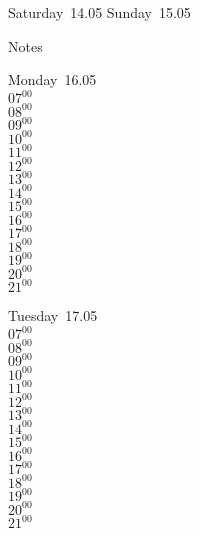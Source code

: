 \documentclass[11pt,a4paper]{book}\usepackage[]{graphicx}\usepackage[]{color}
\begin{document}
\begin{weekendbox}
  Saturday~14.05
  \tcblower
  Sunday~15.05
\end{weekendbox} %
\begin{notebox}
  Notes
\end{notebox}
\clearpage
\begin{headerbox}
\end{headerbox}
\begin{weekdaybox}
  Monday~16.05\\
  { 
  \vfill
  $07^{00}$\\
$08^{00}$\\
$09^{00}$\\
$10^{00}$\\
$11^{00}$\\
$12^{00}$\\
$13^{00}$\\
$14^{00}$\\
$15^{00}$\\
$16^{00}$\\
$17^{00}$\\
$18^{00}$\\
$19^{00}$\\
$20^{00}$\\
$21^{00}$\\
  }
\end{weekdaybox}
\begin{weekdaybox}
  Tuesday~17.05\\
  { 
  \vfill
  $07^{00}$\\
$08^{00}$\\
$09^{00}$\\
$10^{00}$\\
$11^{00}$\\
$12^{00}$\\
$13^{00}$\\
$14^{00}$\\
$15^{00}$\\
$16^{00}$\\
$17^{00}$\\
$18^{00}$\\
$19^{00}$\\
$20^{00}$\\
$21^{00}$\\
  }
\end{weekdaybox}
\end{document}
